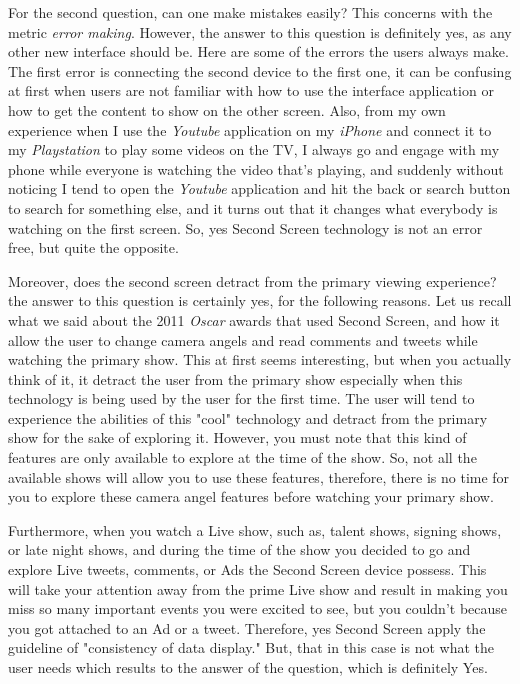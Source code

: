 \documentclass[12pt, oneside]{amsart}   	%
\begin{document}
 For the second question, can one make mistakes easily?  This concerns with the metric  \emph{error making}. However, the answer to this question is definitely yes, as any other new interface should be.  Here are some of the errors the users always make.  The first error is connecting the second device to the first one, it can be confusing at first when users are not familiar with how to use the interface application or how to get the content to show on the other screen.  Also, from my own experience when I use the \emph{Youtube} application on my  \emph{iPhone} and connect it to my  \emph{Playstation} to play  some videos on the TV, I always go and engage with my phone while everyone is watching the video that's playing,  and suddenly without noticing I tend to open the \emph{Youtube} application and hit the back or search button to search for something else, and it turns out that it changes what everybody is watching on the first screen.  So, yes Second Screen technology is not an error free, but quite the opposite.
 
 Moreover, does the second screen detract from the primary viewing experience?  the answer to this question is certainly yes, for the following reasons.  Let us recall what we said about the 2011 \emph{Oscar} awards that used Second Screen, and how it allow the user to change camera angels and read comments and tweets while watching the primary show.  This at first seems interesting, but when you actually think of it, it detract the user from the primary show especially when this technology is being used  by the user for the first time.  The user will tend to experience the abilities of this "cool" technology and detract from the primary show for the sake of exploring it.  However, you must note that this kind of features are only available to explore at the time of the show.  So, not all the available shows will allow you to use these features, therefore, there is no time for you to explore these camera angel features before watching your primary show. 
 
 Furthermore, when you watch a Live show, such as, talent shows, signing shows, or late night shows, and during the time of the show you decided to go and explore Live tweets, comments, or Ads the Second Screen device possess.  This will take your attention away from the prime Live show and result in making you miss so many important events you were excited to see, but you couldn't because you got attached to an Ad or a tweet\cite{BenifitsAndImpacts}.  Therefore, yes Second Screen apply the guideline of "consistency of data display."  But, that in this case is not what the user needs which results to the answer of the question, which is definitely Yes. 
  
\end{document}
